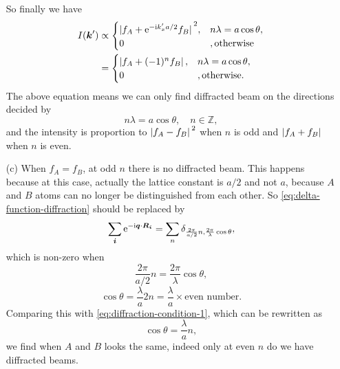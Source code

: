 \documentclass[hyperref, a4paper]{article}
\newcommand*{\ii}{\mathrm{i}}
\newcommand*{\ee}{\mathrm{e}}
\begin{document}
\begin{itemize}
\begin{equation}
    \label{eq:delta-function-diffraction}
\end{equation}
So finally we have
\begin{equation}
    \begin{aligned}
        I(\vb*{k}')  &\propto \begin{cases}
           \abs*{f_A + \ee^{- \ii k_x' a / 2} f_B }^2 , & n \lambda = a \cos \theta, \\
            0 &, \text{otherwise}
        \end{cases} \\
        &= \begin{cases}
            \abs*{f_A + (-1)^n f_B}, & n \lambda = a \cos \theta , \\
            0 &, \text{otherwise}.
        \end{cases}
    \end{aligned}
\end{equation}
The above equation means we can only find diffracted beam on the directions decided by 
\begin{equation}
    n \lambda = a \cos \theta, \quad n \in \mathbb{Z},
    \label{eq:diffraction-condition-1}
\end{equation}
and the intensity is proportion to $\abs*{f_A - f_B}^2$ when $n$ is odd
and $\abs*{f_A + f_B}$ when $n$ is even.

\item[(c)] When $f_A = f_B$, 
at odd $n$ there is no diffracted beam.
This happens because at this case, actually the lattice constant is $a/2$ and not $a$,
because $A$ and $B$ atoms can no longer be distinguished from each other.
So \eqref{eq:delta-function-diffraction} should be replaced by 
\begin{equation}
    \sum_{\vb*{i}} \ee^{- \ii \vb*{q} \cdot \vb*{R}_{\vb*{i}}} = \sum_{n} \delta_{\frac{2\pi}{a/2}n, \frac{2\pi}{\lambda} \cos \theta},
\end{equation}
which is non-zero when 
\[
    \frac{2\pi}{a/2}n = \frac{2\pi}{\lambda} \cos \theta ,
\]
\begin{equation}
    \cos \theta = \frac{\lambda}{a} 2n = \frac{\lambda}{a} \times \text{even number}.
\end{equation}
Comparing this with \eqref{eq:diffraction-condition-1},
which can be rewritten as 
\[
    \cos \theta = \frac{\lambda}{a} n,
\]
we find when $A$ and $B$ looks the same, 
indeed only at even $n$ do we have diffracted beams.

\end{itemize}
\end{document}
